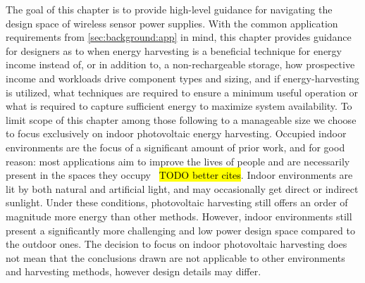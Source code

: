 The goal of this chapter is to provide high-level guidance for navigating the design space of wireless sensor power supplies. 
With the common application requirements from \cref{sec:background:app} in mind, this chapter provides guidance for designers as to when energy harvesting is a beneficial technique for energy income instead of, or in addition to, a non-rechargeable storage, how prospective income and workloads drive component types and sizing, and if energy-harvesting is utilized, what techniques are required to ensure a minimum useful operation or what is required to capture sufficient energy to maximize system availability. 
To limit scope of this chapter among those following to a manageable size we choose to focus exclusively on indoor photovoltaic energy harvesting.
Occupied indoor environments are the focus of a significant
amount of
prior work, 
and for good reason: most
applications aim to improve the lives of people and are necessarily present
in the spaces they occupy~\cite{hesterTimely17,hesterFlicker17,colinReconfigurable18,campbellEnergy14} \hl{TODO better cites}.
Indoor environments are lit by both natural and artificial light, 
and may occasionally get direct or indirect sunlight. 
Under these conditions, photovoltaic harvesting still offers an order of magnitude more energy than other methods.
However, indoor environments still present a significantly more challenging and low power design space compared to the outdoor ones. 
The decision to focus on indoor photovoltaic harvesting does not mean that the conclusions drawn are not applicable to other
environments and harvesting methods, however design details may differ. 

